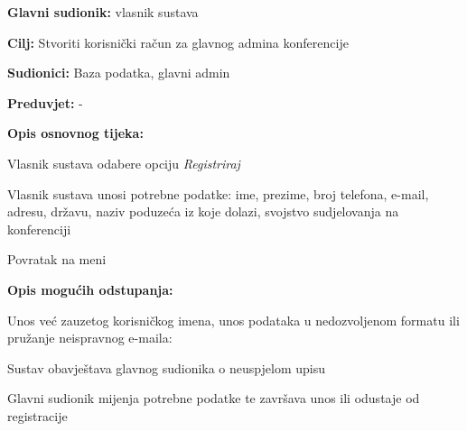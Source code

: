      \noindent {}
					\begin{packed_item}
	
						\item \textbf{Glavni sudionik: }vlasnik sustava
						\item  \textbf{Cilj:} Stvoriti korisnički račun za  glavnog admina konferencije
						\item  \textbf{Sudionici:} Baza podatka, glavni admin
						\item  \textbf{Preduvjet:} -
						\item  \textbf{Opis osnovnog tijeka:}
						
						\item[] \begin{packed_enum}

							\item Vlasnik sustava odabere opciju \textit{Registriraj}
							\item Vlasnik sustava unosi potrebne podatke: ime, prezime, broj telefona, e-mail, adresu, državu, naziv poduzeća iz koje dolazi, svojstvo sudjelovanja na konferenciji
                                \item Povratak na meni
						
						\end{packed_enum}
						\item  \textbf{Opis mogućih odstupanja:}
						
						\item[] \begin{packed_item}

                                    \item[1.]  Unos već zauzetog korisničkog imena, unos podataka u nedozvoljenom       formatu ili pružanje neispravnog e-maila:
							\item[] \begin{packed_enum}
								
								\item Sustav obavještava glavnog sudionika o neuspjelom upisu
								\item Glavni sudionik mijenja potrebne podatke te završava unos ili odustaje od registracije
							
						\end{packed_enum}
					\end{packed_item}
     \end{packed_item}

